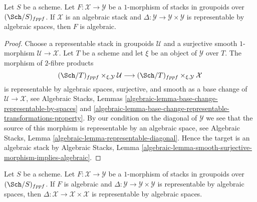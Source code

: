 \begin{lemma}
\label{lemma-map-from-algebraic}
Let $S$ be a scheme. Let $F : \mathcal{X} \to \mathcal{Y}$ be a $1$-morphism
of stacks in groupoids over $(\Sch/S)_{fppf}$. If $\mathcal{X}$ is an
algebraic stack and $\Delta : \mathcal{Y} \to \mathcal{Y} \times \mathcal{Y}$
is representable by algebraic spaces, then $F$ is algebraic.
\end{lemma}

\begin{proof}
Choose a representable stack in groupoids $\mathcal{U}$ and a surjective
smooth $1$-morphism $\mathcal{U} \to \mathcal{X}$. Let $T$ be a scheme and
let $\xi$ be an object of $\mathcal{Y}$ over $T$. The morphism of
$2$-fibre products
$$
(\Sch/T)_{fppf} \times_{\xi, \mathcal{Y}} \mathcal{U}
\longrightarrow
(\Sch/T)_{fppf} \times_{\xi, \mathcal{Y}} \mathcal{X}
$$
is representable by algebraic spaces, surjective, and smooth as a
base change of $\mathcal{U} \to \mathcal{X}$, see
Algebraic Stacks,
Lemmas \ref{algebraic-lemma-base-change-representable-by-spaces} and
\ref{algebraic-lemma-base-change-representable-transformations-property}.
By our condition on the diagonal of $\mathcal{Y}$ we see that
the source of this morphism is representable by an algebraic space, see
Algebraic Stacks, Lemma \ref{algebraic-lemma-representable-diagonal}.
Hence the target is an algebraic stack by
Algebraic Stacks,
Lemma \ref{algebraic-lemma-smooth-surjective-morphism-implies-algebraic}.
\end{proof}

\begin{lemma}
\label{lemma-diagonals-and-algebraic-morphisms}
Let $S$ be a scheme. Let $F : \mathcal{X} \to \mathcal{Y}$ be a $1$-morphism
of stacks in groupoids over $(\Sch/S)_{fppf}$.
If $F$ is algebraic and
$\Delta : \mathcal{Y} \to \mathcal{Y} \times \mathcal{Y}$
is representable by algebraic spaces, then
$\Delta : \mathcal{X} \to \mathcal{X} \times \mathcal{X}$
is representable by algebraic spaces.
\end{lemma}

